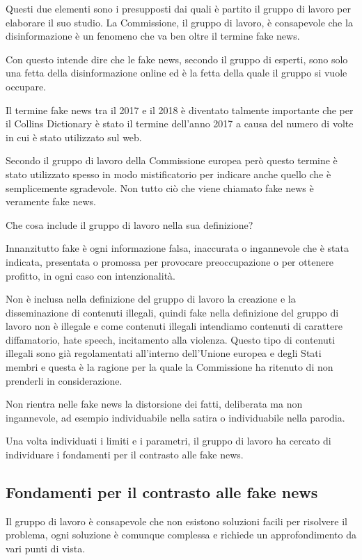 Questi due elementi sono i presupposti dai quali è partito il gruppo di lavoro per elaborare il suo studio. La Commissione, il gruppo di lavoro, è consapevole che la disinformazione è un fenomeno che va ben oltre il termine fake news.

Con questo intende dire che le fake news, secondo il gruppo di esperti, sono solo una fetta della disinformazione online ed è la fetta della quale il gruppo si vuole occupare.

Il termine fake news tra il 2017 e il 2018 è diventato talmente importante che per il Collins Dictionary è stato il termine dell'anno 2017 a causa del numero di volte in cui è stato utilizzato sul web.

Secondo il gruppo di lavoro della Commissione europea però questo termine è stato utilizzato spesso in modo mistificatorio per indicare anche quello che è semplicemente sgradevole. Non tutto ciò che viene chiamato fake news è veramente fake news.

Che cosa include il gruppo di lavoro nella sua definizione? 

Innanzitutto fake è ogni informazione falsa, inaccurata o ingannevole che è stata indicata, presentata o promossa per provocare preoccupazione o per ottenere profitto, in ogni caso con intenzionalità. 

Non è inclusa nella definizione del gruppo di lavoro la creazione e la disseminazione di contenuti illegali, quindi fake nella definizione del gruppo di lavoro non è illegale e come contenuti illegali intendiamo contenuti di carattere diffamatorio, hate speech, incitamento alla violenza. Questo tipo di contenuti illegali sono già regolamentati all'interno dell'Unione europea e degli Stati membri e questa è la ragione per la quale la Commissione ha ritenuto di non prenderli in considerazione.

Non rientra nelle fake news la distorsione dei fatti, deliberata ma non ingannevole, ad esempio individuabile nella satira o individuabile nella parodia.

Una volta individuati i limiti e i parametri, il gruppo di lavoro ha cercato di individuare i fondamenti per il contrasto alle fake news.
\subsection{Fondamenti per il contrasto alle fake news}

Il gruppo di lavoro è consapevole che non esistono soluzioni facili per risolvere il problema, ogni soluzione è comunque complessa e richiede un approfondimento da vari punti di vista. 

